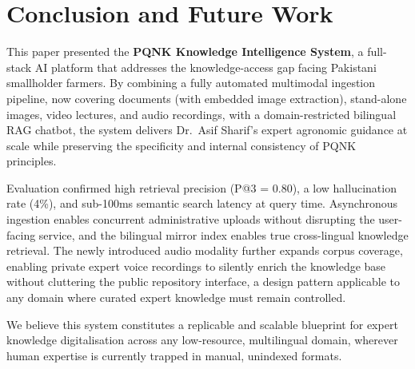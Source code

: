 \documentclass[conference]{IEEEtran}
\begin{document}
\section{Conclusion and Future Work}

This paper presented the \textbf{PQNK Knowledge Intelligence System}, a full-stack AI
platform that addresses the knowledge-access gap facing Pakistani smallholder farmers.
By combining a fully automated multimodal ingestion pipeline, now covering documents
(with embedded image extraction), stand-alone images, video lectures, and audio
recordings, with a domain-restricted bilingual RAG chatbot, the system delivers
Dr.~Asif Sharif's expert agronomic guidance at scale while preserving the specificity
and internal consistency of PQNK principles.

Evaluation confirmed high retrieval precision (P@3 = 0.80), a low hallucination rate
(4\%), and sub-100ms semantic search latency at query time. Asynchronous ingestion
enables concurrent administrative uploads without disrupting the user-facing service,
and the bilingual mirror index enables true cross-lingual knowledge retrieval. The
newly introduced audio modality further expands corpus coverage, enabling private
expert voice recordings to silently enrich the knowledge base without cluttering the
public repository interface, a design pattern applicable to any domain where curated
expert knowledge must remain controlled.

We believe this system constitutes a replicable and scalable blueprint for expert
knowledge digitalisation across any low-resource, multilingual domain, wherever human
expertise is currently trapped in manual, unindexed formats.
\end{document}
